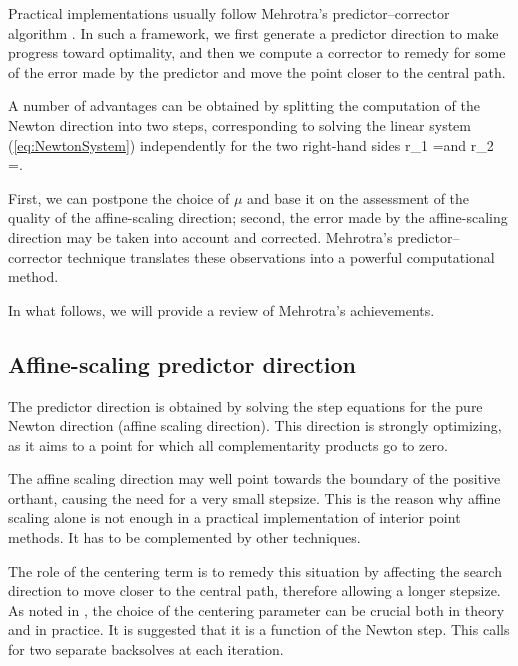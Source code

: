 Practical implementations usually follow Mehrotra's predictor--corrector 
algorithm \cite{Mehrotra92}. In such a framework, we first generate a 
predictor direction to make progress toward optimality, and then we 
compute a corrector to remedy for some of the error made by the predictor
and move the point closer to the central path.


A number of advantages can be obtained by splitting the computation 
of the Newton direction into two steps, corresponding to solving the linear
system (\ref{eq:NewtonSystem}) independently for the two right-hand 
sides 
\be \label{eq:PredictorRhs}
r_1 = \quad \mbox{and} \quad
r_2 =\left[ 
  \begin{array}{c}
    0 \\ 0 \\ \mu e
  \end{array} \right].
\ee

First, we can postpone the choice of $\mu$ and base it
on the assessment of the quality of the affine-scaling direction;
second, the error made by the affine-scaling direction may be 
taken into account and
corrected. Mehrotra's predictor--corrector technique \cite{Mehrotra92}
translates these observations into a powerful computational method.

In what follows, we will provide a review of Mehrotra's achievements.


%
%
\subsection{Affine-scaling predictor direction}

The predictor direction is obtained by solving the step equations 
for the pure Newton direction (affine scaling direction). This 
direction is strongly optimizing, as it aims to a point for which 
all complementarity products go to zero. 

The affine scaling direction may well point towards the boundary 
of the positive orthant, causing the need for a very small stepsize. 
This is the reason why affine scaling alone is not enough in a 
practical implementation of interior point methods. It has to be 
complemented by other techniques.

The role of the centering term is to remedy this situation by 
affecting the search direction to move closer to the central path, 
therefore allowing a longer stepsize. 
As noted in \cite{TapiaZhangSaltzmanWeiser}, the choice of the 
centering parameter can be crucial both in theory and in practice. 
It is suggested that it is a function of the Newton step. 
This calls for two separate backsolves at each iteration.

